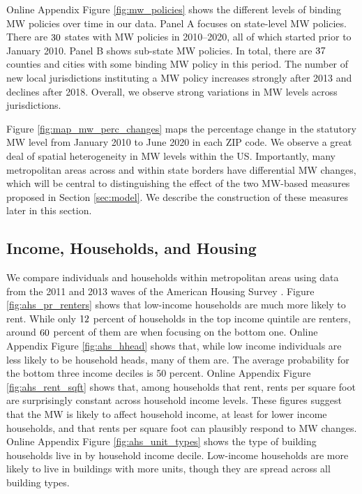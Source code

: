 Online Appendix Figure \ref{fig:mw_policies} shows the different levels of 
binding MW policies over time in our data.
Panel A focuses on state-level MW policies.
There are $\textnormal{30}$ states with MW policies in 2010--2020, all of 
which started prior to January 2010.
Panel B shows sub-state MW policies.
In total, there are $\textnormal{37}$ counties and cities with some binding MW
policy in this period.
The number of new local jurisdictions instituting a MW policy increases strongly 
after 2013 and declines after 2018.
Overall, we observe strong variations in MW levels across jurisdictions.

Figure \ref{fig:map_mw_perc_changes} maps the percentage change in 
the statutory MW level from January 2010 to June 2020 in each ZIP code.
We observe a great deal of spatial heterogeneity in MW levels within the US.
Importantly, many metropolitan areas across and within state borders have 
differential MW changes, which will be central to distinguishing the effect 
of the two MW-based measures proposed in Section \ref{sec:model}.
We describe the construction of these measures later in this section.

\subsection{Income, Households, and Housing}
\label{sec:data_income_housing}

We compare individuals and households within metropolitan areas using data 
from the 2011 and 2013 waves of the American Housing Survey \parencite{ahs2020}.
Figure \ref{fig:ahs_pr_renters} shows that low-income households are much
more likely to rent.
While only $\textnormal{12}$ percent of households in the top income quintile 
are renters, around $\textnormal{60}$ percent of them are when focusing on 
the bottom one.
Online Appendix Figure \ref{fig:ahs_hhead} shows that, while low income 
individuals are less likely to be household heads, many of them are.
The average probability for the bottom three income deciles is 50 percent.
Online Appendix Figure \ref{fig:ahs_rent_sqft} shows that, among households 
that rent, rents per square foot are surprisingly constant across household 
income levels.
These figures suggest that the MW is likely to affect household income, at 
least for lower income households, and that rents per square foot can plausibly
respond to MW changes.
Online Appendix Figure \ref{fig:ahs_unit_types} shows the type of building 
households live in by household income decile.
Low-income households are more likely to live in buildings with more units,
though they are spread across all building types.

